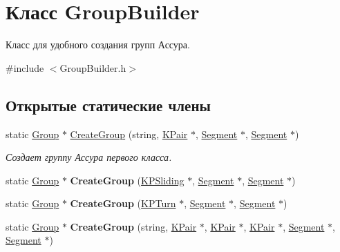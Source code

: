 \hypertarget{class_group_builder}{
\section{Класс GroupBuilder}
\label{class_group_builder}
}


Класс для удобного создания групп Ассура.  




{\ttfamily \#include $<$GroupBuilder.h$>$}

\subsection*{Открытые статические члены}
\begin{DoxyCompactItemize}
\item 
static \hyperlink{class_group}{Group} $\ast$ \hyperlink{class_group_builder_a75d6fb317f63baf9f9bf255696bd2628}{CreateGroup} (string, \hyperlink{class_k_pair}{KPair} $\ast$, \hyperlink{class_segment}{Segment} $\ast$, \hyperlink{class_segment}{Segment} $\ast$)
\begin{DoxyCompactList}\small\item\em Создает группу Ассура первого класса. \item\end{DoxyCompactList}\item 
\hypertarget{class_group_builder_ae95751abdddebc0d44055c7e044587f1}{
static \hyperlink{class_group}{Group} $\ast$ {\bfseries CreateGroup} (\hyperlink{class_k_p_sliding}{KPSliding} $\ast$, \hyperlink{class_segment}{Segment} $\ast$, \hyperlink{class_segment}{Segment} $\ast$)}
\label{class_group_builder_ae95751abdddebc0d44055c7e044587f1}

\item 
\hypertarget{class_group_builder_a073760bbc63a1f360e657b6a49da3fc5}{
static \hyperlink{class_group}{Group} $\ast$ {\bfseries CreateGroup} (\hyperlink{class_k_p_turn}{KPTurn} $\ast$, \hyperlink{class_segment}{Segment} $\ast$, \hyperlink{class_segment}{Segment} $\ast$)}
\label{class_group_builder_a073760bbc63a1f360e657b6a49da3fc5}

\item 
\hypertarget{class_group_builder_a9655d166c07df96b97f61a2941e21133}{
static \hyperlink{class_group}{Group} $\ast$ {\bfseries CreateGroup} (string, \hyperlink{class_k_pair}{KPair} $\ast$, \hyperlink{class_k_pair}{KPair} $\ast$, \hyperlink{class_k_pair}{KPair} $\ast$, \hyperlink{class_segment}{Segment} $\ast$, \hyperlink{class_segment}{Segment} $\ast$)}
\label{class_group_builder_a9655d166c07df96b97f61a2941e21133}


\end{DoxyCompactItemize}

